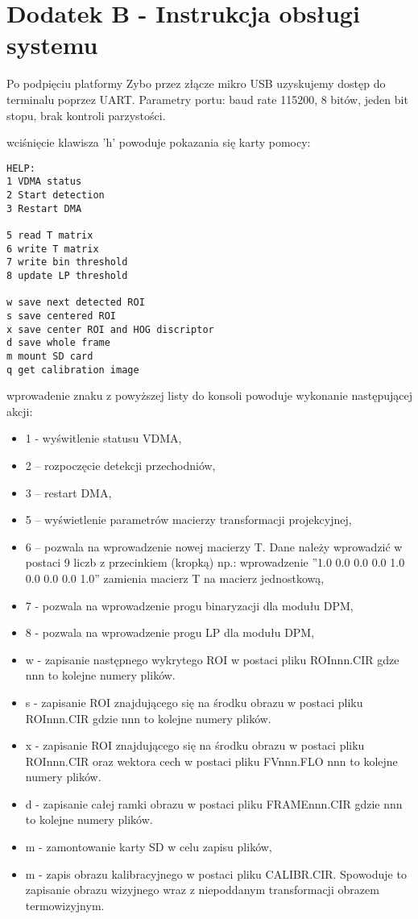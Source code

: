 \chapter{Dodatek B - Instrukcja obsługi systemu}

Po podpięciu platformy Zybo przez złącze mikro USB uzyskujemy dostęp do terminalu poprzez UART. Parametry portu: baud rate 115200, 8 bitów, jeden bit stopu, brak kontroli parzystości.

wciśnięcie klawisza 'h' powoduje pokazania się karty pomocy:

\begin{lstlisting}
HELP:
1 VDMA status
2 Start detection
3 Restart DMA

5 read T matrix
6 write T matrix
7 write bin threshold
8 update LP threshold

w save next detected ROI
s save centered ROI
x save center ROI and HOG discriptor
d save whole frame
m mount SD card
q get calibration image

\end{lstlisting}
 
\noindent wprowadenie znaku z powyższej listy do konsoli powoduje wykonanie następującej akcji:
 
\begin{itemize}
\item 1 - wyświtlenie statusu VDMA,
\item 2 – rozpoczęcie detekcji przechodniów,
\item 3 – restart DMA,
\item 5 – wyświetlenie parametrów macierzy transformacji projekcyjnej,
\item 6 – pozwala na wprowadzenie nowej macierzy T. Dane należy wprowadzić w postaci 9 liczb z przecinkiem (kropką) np.: wprowadzenie ''1.0 0.0 0.0 0.0 1.0 0.0 0.0 0.0 1.0'' zamienia macierz T na macierz jednostkową,
\item 7 - pozwala na wprowadzenie progu binaryzacji dla modułu DPM,
\item 8 - pozwala na wprowadzenie progu LP dla modułu DPM,
\item w - zapisanie następnego wykrytego ROI w postaci pliku ROInnn.CIR gdze nnn to kolejne numery plików.
\item s - zapisanie ROI znajdującego się na środku obrazu w postaci pliku ROInnn.CIR gdzie nnn to kolejne numery plików.
\item x - zapisanie ROI znajdującego się na środku obrazu w postaci pliku ROInnn.CIR  oraz wektora cech w postaci pliku FVnnn.FLO nnn to kolejne numery plików.
\item d - zapisanie całej ramki obrazu w postaci pliku FRAMEnnn.CIR gdzie nnn to kolejne numery plików.
\item m - zamontowanie karty SD w celu zapisu plików,
\item m - zapis obrazu kalibracyjnego w postaci pliku CALIBR.CIR. Spowoduje to zapisanie obrazu wizyjnego wraz z niepoddanym transformacji obrazem termowizyjnym.
\end{itemize}

